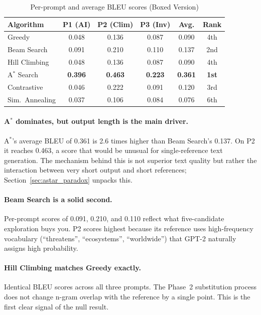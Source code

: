 \documentclass[12pt]{article}
\begin{document}
\begin{table}[ht]
	\centering
	\caption{Per-prompt and average BLEU scores (Boxed Version)}
	\label{tab:bleu_boxed}
	\small
	\setlength{\tabcolsep}{4pt}
	\begin{tabularx}{\linewidth}{|X|c|c|c|c|c|}
		\hline
		\textbf{Algorithm} & \textbf{P1 (AI)} & \textbf{P2 (Clim)} & \textbf{P3 (Inv)} & \textbf{Avg.} & \textbf{Rank} \\ \hline
		Greedy          & 0.048 & 0.136 & 0.087 & 0.090 & 4th \\ \hline
		Beam Search     & 0.091 & 0.210 & 0.110 & 0.137 & 2nd \\ \hline
		Hill Climbing   & 0.048 & 0.136 & 0.087 & 0.090 & 4th \\ \hline
		A$^*$ Search    & \textbf{0.396} & \textbf{0.463} & \textbf{0.223} & \textbf{0.361} & \textbf{1st} \\ \hline
		Contrastive     & 0.046 & 0.222 & 0.091 & 0.120 & 3rd \\ \hline
		Sim.\ Annealing & 0.037 & 0.106 & 0.084 & 0.076 & 6th \\ \hline
	\end{tabularx}
\end{table}

	\paragraph{A$^*$ dominates, but output length is the main driver.}
	A$^*$'s average BLEU of 0.361 is 2.6 times higher than Beam Search's 0.137. On P2 it reaches 0.463, a score that would be unusual for single-reference text generation. The mechanism behind this is not superior text quality but rather the interaction between very short output and short references; Section~\ref{sec:astar_paradox} unpacks this.
	
	\paragraph{Beam Search is a solid second.}
	Per-prompt scores of 0.091, 0.210, and 0.110 reflect what five-candidate exploration buys you. P2 scores highest because its reference uses high-frequency vocabulary (``threatens'', ``ecosystems'', ``worldwide'') that GPT-2 naturally assigns high probability.
	
	\paragraph{Hill Climbing matches Greedy exactly.}
	Identical BLEU scores across all three prompts. The Phase~2 substitution process does not change n-gram overlap with the reference by a single point. This is the first clear signal of the null result.
	
\end{document}
